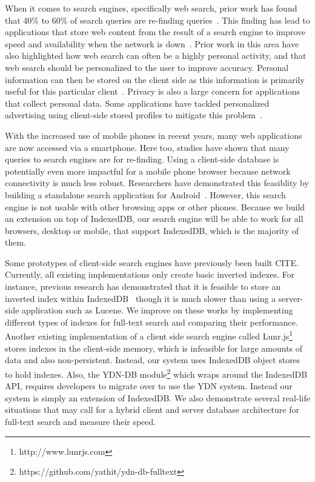 \documentclass{vldb}
\begin{document}
When it comes to search engines, specifically web search, prior work has found that 40\% to 60\% of search queries are re-finding queries~\cite{teevan2005personalizing}. This finding has lead to applications that store web content from the result of a search engine to improve speed and availability when the network is down~\cite{bozzon2010liquid,bharat2000searchpad,balasubramanian2012findall}. Prior work in this area have also highlighted how web search can often be a highly personal activity, and that web search should be personalized to the user to improve accuracy. Personal information can then be stored on the client side as this information is primarily useful for this particular client~\cite{teevan2005personalizing}.
Privacy is also a large concern for applications that collect personal data. Some applications have tackled personalized advertising using client-side stored profiles to mitigate this problem~\cite{bilenko2011predictive}.

With the increased use of mobile phones in recent years, many web applications are now accessed via a smartphone. Here too, studies have shown that many queries to search engines are for re-finding. Using a client-side database is potentially even more impactful for a mobile phone browser because network connectivity is much less robust. Researchers have demonstrated this feasiblity by building a standalone search application for Android~\cite{balasubramanian2012findall}. However, this search engine is not usable with other browsing apps or other phones. Because we build an extension on top of IndexedDB, our search engine will be able to work for all browsers, desktop or mobile, that support IndexedDB, which is the majority of them.

Some prototypes of client-side search engines have previously been built CITE. Currently, all existing implementations only create basic inverted indexes.
For instance, previous research has demonstrated that it is feasible to store an inverted index within IndexedDB~\cite{lin:jscene} though it is much slower than using a server-side application such as Lucene.
We improve on these works by implementing different types of indexes for full-text search and comparing their performance. 
Another existing implementation of a client side search engine called Lunr.js\footnote{http://www.lunrjs.com} stores indexes in the client-side memory, which is infeasible for large amounts of data and also non-persistent. Instead, our system uses IndexedDB object stores to hold indexes. Also, the YDN-DB module\footnote{https://github.com/yathit/ydn-db-fulltext} which wraps around the IndexedDB API, requires developers to migrate over to use the YDN system. Instead our system is simply an extension of IndexedDB.
We also demonstrate several real-life situations that may call for a hybrid client and server database architecture for full-text search and measure their speed.
\end{document}
